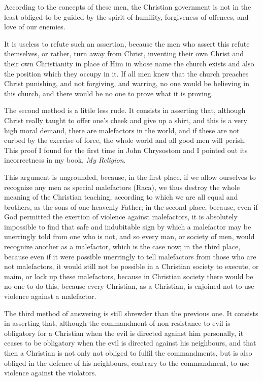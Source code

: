 \documentclass{book}
\begin{document}
According to the concepts of these men, the Christian government is not in the least obliged to be guided by the spirit of humility, forgiveness of offences, and love of our enemies.

It is useless to refute such an assertion, because the men who assert this refute themselves, or rather, turn away from Christ, inventing their own Christ and their own Christianity in place of Him in whose name the church exists and also the position which they occupy in it. If all men knew that the church preaches Christ punishing, and not forgiving, and warring, no one would be believing in this church, and there would be no one to prove what it is proving.

The second method is a little less rude. It consists in asserting that, although Christ really taught to offer one’s cheek and give up a shirt, and this is a very high moral demand, there are malefactors in the world, and if these are not curbed by the exercise of force, the whole world and all good men will perish. This proof I found for the first time in John Chrysostom and I pointed out its incorrectness in my book, \emph{My Religion}.

This argument is ungrounded, because, in the first place, if we allow ourselves to recognize any men as special malefactors (Raca), we thus destroy the whole meaning of the Christian teaching, according to which we are all equal and brothers, as the sons of one heavenly Father; in the second place, because, even if God permitted the exertion of violence against malefactors, it is absolutely impossible to find that safe and indubitable sign by which a malefactor may be unerringly told from one who is not, and so every man, or society of men, would recognize another as a malefactor, which is the case now; in the third place, because even if it were possible unerringly to tell malefactors from those who are not malefactors, it would still not be possible in a Christian society to execute, or maim, or lock up these malefactors, because in Christian society there would be no one to do this, because every Christian, as a Christian, is enjoined not to use violence against a malefactor.

The third method of answering is still shrewder than the previous one. It consists in asserting that, although the commandment of non-resistance to evil is obligatory for a Christian when the evil is directed against him personally, it ceases to be obligatory when the evil is directed against his neighbours, and that then a Christian is not only not obliged to fulfil the commandments, but is also obliged in the defence of his neighbours, contrary to the commandment, to use violence against the violators.
\end{document}
